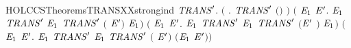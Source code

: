 \newcommand{\HOLCCSTheoremsTRANSXXrules}{\UseVerbatim{HOLCCSTheoremsTRANSXXrules}}
\begin{SaveVerbatim}{HOLCCSTheoremsTRANSXXstrongind}
\HOLTokenTurnstile{} \HOLSymConst{\HOLTokenForall{}}\ensuremath{\HOLBoundVar{TRANS}\sp{\prime}}.
       \ensuremath{(}\HOLSymConst{\HOLTokenForall{}} . \ensuremath{\HOLBoundVar{TRANS}\sp{\prime}} \ensuremath{(}\HOLSymConst{\ensuremath{\ldotp}}\ensuremath{)}  \ensuremath{)} \HOLSymConst{\HOLTokenConj{}}
       \ensuremath{(}\HOLSymConst{\HOLTokenForall{}}  \ensuremath{\HOLBoundVar{E}\sb{\mathrm{1}}} \ensuremath{\HOLBoundVar{E}\sp{\prime}}.
             \HOLTokenTransBegin{}\HOLTokenTransEnd \ensuremath{\HOLBoundVar{E}\sb{\mathrm{1}}} \HOLSymConst{\HOLTokenConj{}} \ensuremath{\HOLBoundVar{TRANS}\sp{\prime}}   \ensuremath{\HOLBoundVar{E}\sb{\mathrm{1}}} \HOLSymConst{\HOLTokenImp{}} \ensuremath{\HOLBoundVar{TRANS}\sp{\prime}} \ensuremath{(} \HOLSymConst{\ensuremath{+}} \ensuremath{\HOLBoundVar{E}\sp{\prime}}\ensuremath{)}  \ensuremath{\HOLBoundVar{E}\sb{\mathrm{1}}}\ensuremath{)} \HOLSymConst{\HOLTokenConj{}}
       \ensuremath{(}\HOLSymConst{\HOLTokenForall{}}  \ensuremath{\HOLBoundVar{E}\sb{\mathrm{1}}} \ensuremath{\HOLBoundVar{E}\sp{\prime}}.
             \HOLTokenTransBegin{}\HOLTokenTransEnd \ensuremath{\HOLBoundVar{E}\sb{\mathrm{1}}} \HOLSymConst{\HOLTokenConj{}} \ensuremath{\HOLBoundVar{TRANS}\sp{\prime}}   \ensuremath{\HOLBoundVar{E}\sb{\mathrm{1}}} \HOLSymConst{\HOLTokenImp{}} \ensuremath{\HOLBoundVar{TRANS}\sp{\prime}} \ensuremath{(}\ensuremath{\HOLBoundVar{E}\sp{\prime}} \HOLSymConst{\ensuremath{+}} \ensuremath{)}  \ensuremath{\HOLBoundVar{E}\sb{\mathrm{1}}}\ensuremath{)} \HOLSymConst{\HOLTokenConj{}}
       \ensuremath{(}\HOLSymConst{\HOLTokenForall{}}  \ensuremath{\HOLBoundVar{E}\sb{\mathrm{1}}} \ensuremath{\HOLBoundVar{E}\sp{\prime}}.
             \HOLTokenTransBegin{}\HOLTokenTransEnd \ensuremath{\HOLBoundVar{E}\sb{\mathrm{1}}} \HOLSymConst{\HOLTokenConj{}} \ensuremath{\HOLBoundVar{TRANS}\sp{\prime}}   \ensuremath{\HOLBoundVar{E}\sb{\mathrm{1}}} \HOLSymConst{\HOLTokenImp{}}
            \ensuremath{\HOLBoundVar{TRANS}\sp{\prime}} \ensuremath{(} \HOLSymConst{\ensuremath{\mid}} \ensuremath{\HOLBoundVar{E}\sp{\prime}}\ensuremath{)}  \ensuremath{(}\ensuremath{\HOLBoundVar{E}\sb{\mathrm{1}}} \HOLSymConst{\ensuremath{\mid}} \ensuremath{\HOLBoundVar{E}\sp{\prime}}\ensuremath{)}\ensuremath{)} \HOLSymConst{\HOLTokenConj{}}

\end{SaveVerbatim}
